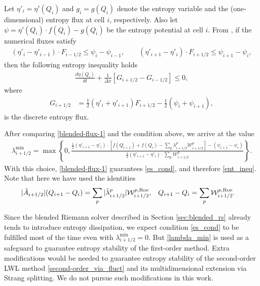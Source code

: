 \documentclass[preprint, 11pt]{article}
\newcommand{\W}{{\mathcal W}}
\newcommand{\iph}{{i+1/2}}
\newcommand{\bff}{{f}}
\newcommand{\bfF}{{F}}
\newcommand{\entvar}{\eta'}
\newcommand{\bfq}{{Q}}
\newcommand{\Roe}{{\rm Roe}}
\newcommand{\efp}{\psi}
\newcommand{\entflux}{g}
\begin{document}
Let $\entvar_i=\entvar(\bfq_i)$ and $\entflux_i=\entflux(\bfq_i)$ denote the entropy variable and the
(one-dimensional) entropy flux at cell $i$, respectively.
Also let $\efp=\entvar(\bfq_i)\cdot \bff(\bfq_i)-\entflux(\bfq_i)$ be the entropy potential at cell $i$.
From \cite[\S 4]{tadmor1987numerical}, if the numerical fluxes satisfy
\begin{align}\label{es_cond}
(\entvar_{i}-\entvar_{i-1})\cdot \bfF_{i-1/2}\leq \efp_{i}-\efp_{i-1},
  \qquad
  (\entvar_{i+1}-\entvar_i)\cdot \bfF_{i+1/2}\leq \efp_{i+1}-\efp_i,
\end{align}
then the following entropy inequality holds
\begin{align}\label{ent_ineq}
  \frac{d\eta(\bfq_i)}{dt}+\frac{1}{\Delta x}\left[G_{i+1/2}-G_{i-1/2}\right]\leq 0,
\end{align}
where
\begin{align*}
    G_{i+1/2} &= \frac{1}{2}\left(\entvar_i+\entvar_{i+1}\right)\bfF_{i+1/2}-\frac{1}{2}(\efp_{i}+\efp_{i+1}),
\end{align*}
is the discrete entropy flux.

After comparing \eqref{blended-flux-1} and the condition above, we arrive at the value
\begin{align}\label{lambda_min}
  \lambda_{i+1/2}^{\min} = \max\left\{0,\frac{\frac{1}{2}(\entvar_{i+1}-\entvar_{i})\cdot\left[\bff(\bfq_{i+1})+\bff(\bfq_{i})-\sum_p\lambda_{i+1/2}^p\W_{i+1/2}^p\right]-(\efp_{i+1}-\efp_i)}{\frac{1}{2}(\entvar_{i+1}-\entvar_{i})\cdot\sum_p\W_{i+1/2}^p}\right\}.
\end{align}
With this choice, \eqref{blended-flux-1} guarantees \eqref{es_cond}, and therefore \eqref{ent_ineq}.
Note that here we have used the identities
\begin{align*}
|\hat{A}_\iph|(Q_{i+1}-Q_i) & = \sum_p |\hat{\lambda}^p_\iph| \W^{p,\Roe}_\iph, & 
Q_{i+1}-Q_i & = \sum_p \W^{p,\Roe}_\iph.
\end{align*}

Since the blended Riemann solver described in Section \ref{sec:blended_rs} already
tends to introduce entropy dissipation,
we expect condition \eqref{es_cond} to be fulfilled most of the time even with $\lambda_{i+1/2}^{\min}=0$.
But \eqref{lambda_min} is used as a safeguard to guarantee entropy stability of the first-order method.
Extra modifications would be needed to guarantee entropy stability of the second-order LWL method
\eqref{second-order_via_fluct} and its multidimensional extension via Strang splitting.
We do not pursue such modifications in this work.
\end{document}
